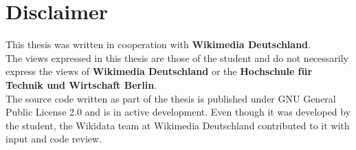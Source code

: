 \chapter*{Disclaimer}

This thesis was written in cooperation with \textbf{Wikimedia Deutschland}. \\
The views expressed in this thesis are those of the student and do not necessarily express the views of \textbf{Wikimedia Deutschland} or the \textbf{Hochschule für Technik und Wirtschaft Berlin}. \\
The source code written as part of the thesis is published under GNU General Public License 2.0 and is in active development. Even though it was developed by the student, the Wikidata team at Wikimedia Deutschland contributed to it with input and code review.

